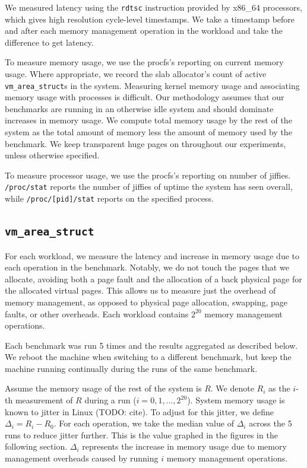 \documentclass[twocolumn,11pt]{article}
\begin{document}
We measured latency using the \texttt{rdtsc} instruction provided by x86\_64
processors, which gives high resolution cycle-level timestamps. We take a
timestamp before and after each memory management operation in the workload and
take the difference to get latency.

To measure memory usage, we use the procfs's reporting on current memory usage.
Where appropriate, we record the slab allocator's count of active
\texttt{vm\_area\_struct}s in the system. Measuring kernel memory usage and
associating memory usage with processes is difficult. Our methodology assumes
that our benchmarks are running in an otherwise idle system and should dominate
increases in memory usage.  We compute total memory usage by the rest of the
system as the total amount of memory less the amount of memory used by the
benchmark. We keep transparent huge pages on throughout our experiments, unless
otherwise specified.

To measure processor usage, we use the procfs's reporting on number of jiffies.
\texttt{/proc/stat} reports the number of jiffies of uptime the system has seen
overall, while \texttt{/proc/[pid]/stat} reports on the specified process.

\subsection{\texttt{vm\_area\_struct}}
\label{ss_vm_area_struct}

For each workload, we measure the latency and increase in memory usage due to
each operation in the benchmark. Notably, we do not touch the pages that we
allocate, avoiding both a page fault and the allocation of a back physical page
for the allocated virtual pages. This allows us to measure just the overhead of
memory management, as opposed to physical page allocation, swapping, page
faults, or other overheads.  Each workload contains $2^{20}$ memory management
operations.

Each benchmark was run 5 times and the results aggregated as described below. We
reboot the machine when switching to a different benchmark, but keep the machine
running continually during the runs of the same benchmark. 

Assume the memory usage of the rest of the system is $R$. We denote $R_i$ as the
$i$-th measurement of $R$ during a run ($i = 0, 1, ..., 2^{20}$). System memory
usage is known to jitter in Linux (TODO: cite). To adjust for this jitter, we
define $\Delta_i = R_i - R_0$. For each operation, we take the median value of
$\Delta_i$ across the 5 runs to reduce jitter further.  This is the value
graphed in the figures in the following section. $\Delta_i$ represents the
increase in memory usage due to memory management overheads caused by running
$i$ memory management operations.
\end{document}
